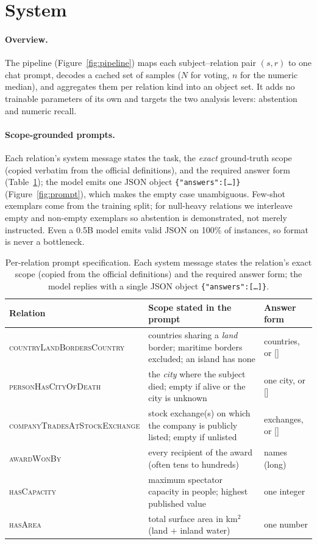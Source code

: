 \section{System}
\label{sec:method}
\paragraph{Overview.}
The pipeline (Figure~\ref{fig:pipeline}) maps each subject--relation pair $(s,r)$
to one chat prompt, decodes a cached set of samples ($N$ for voting, $n$ for the
numeric median), and aggregates them per relation kind into an object set. It adds
no trainable parameters of its own and targets the two analysis levers: abstention
and numeric recall.

\paragraph{Scope-grounded prompts.}
Each relation's system message states the task, the \emph{exact} ground-truth
scope (copied verbatim from the official definitions), and the required answer
form (Table~\ref{tab:prompts}); the model emits one JSON object
\texttt{\{"answers":[\dots]\}} (Figure~\ref{fig:prompt}), which makes the empty
case unambiguous. Few-shot exemplars come from the training split; for null-heavy
relations we interleave empty and non-empty exemplars so abstention is
demonstrated, not merely instructed. Even a 0.5B model emits valid JSON on 100\%
of instances, so format is never a bottleneck.

\begin{table}[t]
\centering\footnotesize
\setlength{\tabcolsep}{5pt}
\begin{tabular}{@{}l p{7.8cm} l@{}}
\toprule
Relation & Scope stated in the prompt & Answer form \\
\midrule
\textsc{countryLandBordersCountry} & countries sharing a \emph{land} border; maritime borders excluded; an island has none & countries, or [] \\
\textsc{personHasCityOfDeath} & the \emph{city} where the subject died; empty if alive or the city is unknown & one city, or [] \\
\textsc{companyTradesAtStockExchange} & stock exchange(s) on which the company is publicly listed; empty if unlisted & exchanges, or [] \\
\textsc{awardWonBy} & every recipient of the award (often tens to hundreds) & names (long) \\
\textsc{hasCapacity} & maximum spectator capacity in people; highest published value & one integer \\
\textsc{hasArea} & total surface area in km$^2$ (land $+$ inland water) & one number \\
\bottomrule
\end{tabular}
\caption{Per-relation prompt specification. Each system message states the
relation's exact scope (copied from the official definitions) and the required
answer form; the model replies with a single JSON object
\texttt{\{"answers":[\dots]\}}.}
\label{tab:prompts}
\end{table}

